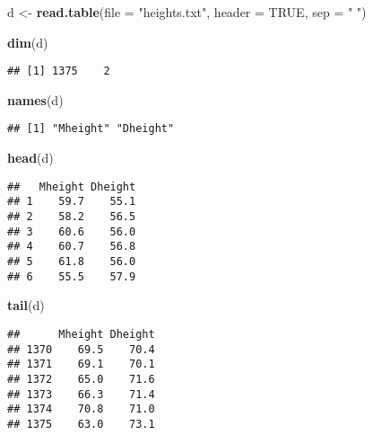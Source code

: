 \documentclass[]{article}
\newenvironment{Shaded}{\begin{snugshade}}{\end{snugshade}}
\newcommand{\DataTypeTok}[1]{\textcolor[rgb]{0.13,0.29,0.53}{#1}}
\newcommand{\KeywordTok}[1]{\textcolor[rgb]{0.13,0.29,0.53}{\textbf{#1}}}
\newcommand{\NormalTok}[1]{#1}
\newcommand{\OtherTok}[1]{\textcolor[rgb]{0.56,0.35,0.01}{#1}}
\newcommand{\StringTok}[1]{\textcolor[rgb]{0.31,0.60,0.02}{#1}}
\begin{document}
\begin{Shaded}
\begin{Highlighting}[]
\NormalTok{d <-}\StringTok{ }\KeywordTok{read.table}\NormalTok{(}\DataTypeTok{file =} \StringTok{"heights.txt"}\NormalTok{, }\DataTypeTok{header =} \OtherTok{TRUE}\NormalTok{, }\DataTypeTok{sep =} \StringTok{" "}\NormalTok{)}
\end{Highlighting}
\end{Shaded}

\begin{Shaded}
\begin{Highlighting}[]
\KeywordTok{dim}\NormalTok{(d)}
\end{Highlighting}
\end{Shaded}

\begin{verbatim}
## [1] 1375    2
\end{verbatim}

\begin{Shaded}
\begin{Highlighting}[]
\KeywordTok{names}\NormalTok{(d)}
\end{Highlighting}
\end{Shaded}

\begin{verbatim}
## [1] "Mheight" "Dheight"
\end{verbatim}

\begin{Shaded}
\begin{Highlighting}[]
\KeywordTok{head}\NormalTok{(d)}
\end{Highlighting}
\end{Shaded}

\begin{verbatim}
##   Mheight Dheight
## 1    59.7    55.1
## 2    58.2    56.5
## 3    60.6    56.0
## 4    60.7    56.8
## 5    61.8    56.0
## 6    55.5    57.9
\end{verbatim}

\begin{Shaded}
\begin{Highlighting}[]
\KeywordTok{tail}\NormalTok{(d)}
\end{Highlighting}
\end{Shaded}

\begin{verbatim}
##      Mheight Dheight
## 1370    69.5    70.4
## 1371    69.1    70.1
## 1372    65.0    71.6
## 1373    66.3    71.4
## 1374    70.8    71.0
## 1375    63.0    73.1
\end{verbatim}
\end{document}
